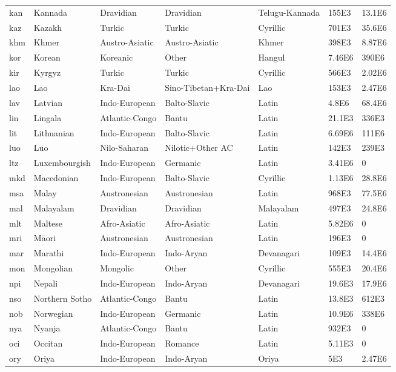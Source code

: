 \begin{tabular}{l l l l lll}
kan	& Kannada	&	Dravidian	&	Dravidian	&	Telugu-Kannada	&	155E3	&	13.1E6	\\
kaz	& Kazakh	&	Turkic	&	Turkic	&	Cyrillic	&	701E3	&	35.6E6	\\
khm	& Khmer	&	Austro-Asiatic	&	Austro-Asiatic	&	Khmer	&	398E3	&	8.87E6	\\
kor	& Korean	&	Koreanic	&	Other	&	Hangul	&	7.46E6	&	390E6	\\
kir	& Kyrgyz	&	Turkic	&	Turkic	&	Cyrillic	&	566E3	&	2.02E6	\\
lao	& Lao	&	Kra-Dai	& Sino-Tibetan+Kra-Dai  &	Lao	&	153E3	&	2.47E6	\\
lav	& Latvian	&	Indo-European	&	Balto-Slavic	&	Latin	&	4.8E6	&	68.4E6	\\
lin	& Lingala	&	Atlantic-Congo	&	Bantu	&	Latin	&	21.1E3	&	336E3	\\
lit	& Lithuanian	&	Indo-European	&	Balto-Slavic	&	Latin	&	6.69E6	&	111E6	\\
luo	& Luo	&	Nilo-Saharan	& Nilotic+Other AC 	&	Latin	&	142E3	&	239E3	\\
ltz	& Luxembourgish	&	Indo-European	&	Germanic	&	Latin	&	3.41E6	&	0	\\
mkd	& Macedonian	&	Indo-European	&	Balto-Slavic	&	Cyrillic	&	1.13E6	&	28.8E6	\\
msa	& Malay	&	Austronesian	&	Austronesian	&	Latin	&	968E3	&	77.5E6	\\
mal	& Malayalam	&	Dravidian	&	Dravidian	&	Malayalam	&	497E3	&	24.8E6	\\
mlt	& Maltese	&	Afro-Asiatic	&	Afro-Asiatic	&	Latin	&	5.82E6	&	0	\\
mri	& Māori	&	Austronesian	&	Austronesian	&	Latin	&	196E3	&	0	\\
mar	& Marathi	&	Indo-European	&	Indo-Aryan	&	Devanagari	&	109E3	&	14.4E6	\\
mon	& Mongolian	&	Mongolic	&	Other	&	Cyrillic	&	555E3	&	20.4E6	\\
npi	& Nepali	&	Indo-European	&	Indo-Aryan	&	Devanagari	&	19.6E3	&	17.9E6	\\
nso	& Northern Sotho	&	Atlantic-Congo	&	Bantu	&	Latin	&	13.8E3	&	612E3	\\
nob	& Norwegian	&	Indo-European	&	Germanic	&	Latin	&	10.9E6	&	338E6	\\
nya	& Nyanja	&	Atlantic-Congo	&	Bantu	&	Latin	&	932E3	&	0	\\
oci	& Occitan	&	Indo-European	&	Romance	&	Latin	&	5.11E3	&	0	\\
ory	& Oriya	&	Indo-European	&	Indo-Aryan	&	Oriya	&	5E3	&	2.47E6	\\

\end{tabular}
